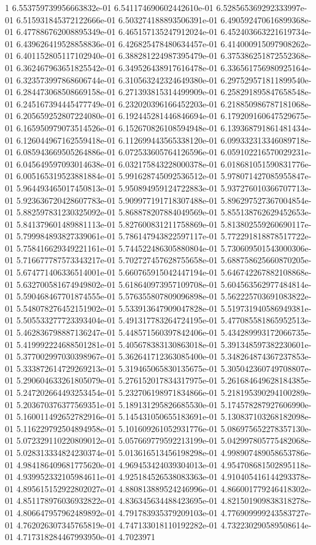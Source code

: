 1	6.553759739956663832e-01	6.541174690602442610e-01	6.528565369292333997e-01	6.515931845372122666e-01	6.503274188893506391e-01	6.490592470616899368e-01	6.477886762008895349e-01	6.465157135247912024e-01	6.452403663221619734e-01	6.439626419528858836e-01	6.426825478480634457e-01	6.414000915097908262e-01	6.401152805117102940e-01	6.388281224987395479e-01	6.375386251872552368e-01	6.362467963651825542e-01	6.349526438917616478e-01	6.336561756980925164e-01	6.323573997868606744e-01	6.310563242324649380e-01	6.297529571811899540e-01	6.284473068508669158e-01	6.271393815314499909e-01	6.258291895847658548e-01	6.245167394445477749e-01	6.232020396166452203e-01	6.218850986787181068e-01	6.205659252807224080e-01	6.192445281446846694e-01	6.179209160647529675e-01	6.165950979073514526e-01	6.152670826108594948e-01	6.139368791861481434e-01	6.126044967162559418e-01	6.112699443565338120e-01	6.099332313346089718e-01	6.085943669505264886e-01	6.072533605764126596e-01	6.059102216570029231e-01	6.045649597093014638e-01	6.032175843228000378e-01	6.018681051590831776e-01	6.005165319523881884e-01	5.991628745092536512e-01	5.978071427085955847e-01	5.964493465017450813e-01	5.950894959124722883e-01	5.937276010366707713e-01	5.923636720428607783e-01	5.909977191718307488e-01	5.896297527367004854e-01	5.882597831230325092e-01	5.868878207884049569e-01	5.855138762629452653e-01	5.841379601489881113e-01	5.827600831211758869e-01	5.813802559260690117e-01	5.799984893827339061e-01	5.786147943822597117e-01	5.772291818878517722e-01	5.758416629349221161e-01	5.744522486305880804e-01	5.730609501543000306e-01	5.716677787573343217e-01	5.702727457628755658e-01	5.688758625660870205e-01	5.674771406336514001e-01	5.660765915042447194e-01	5.646742267882108868e-01	5.632700581674949802e-01	5.618640973957109708e-01	5.604563562977484814e-01	5.590468467701874555e-01	5.576355807809096898e-01	5.562225703691083822e-01	5.548078276452151902e-01	5.533913647909047828e-01	5.519731940586949381e-01	5.505533277723393404e-01	5.491317783264724195e-01	5.477085581865952513e-01	5.462836798887136247e-01	5.448571560397842406e-01	5.434289993172066735e-01	5.419992224688501281e-01	5.405678383130863018e-01	5.391348597382230601e-01	5.377002997030398967e-01	5.362641712363085400e-01	5.348264874367237853e-01	5.333872614729269213e-01	5.319465065830135675e-01	5.305042360749708807e-01	5.290604633261805079e-01	5.276152017834317975e-01	5.261684649628184385e-01	5.247202664493253454e-01	5.232706198971834866e-01	5.218195390294100289e-01	5.203670376377569351e-01	5.189131295826685530e-01	5.174578287927606990e-01	5.160011492652782916e-01	5.145431050655183691e-01	5.130837103268182098e-01	5.116229792504894958e-01	5.101609261052931776e-01	5.086975652278357130e-01	5.072329110220809012e-01	5.057669779592213199e-01	5.042997805775482068e-01	5.028313334824230374e-01	5.013616513456198298e-01	4.998907489058653786e-01	4.984186409681775620e-01	4.969453424039304013e-01	4.954708681502895118e-01	4.939952332105984611e-01	4.925184526538083363e-01	4.910405416144293378e-01	4.895615152922802027e-01	4.880813889524246996e-01	4.866001779246418302e-01	4.851178976036932822e-01	4.836345634488423695e-01	4.821501909838318278e-01	4.806647957962489892e-01	4.791783935379209103e-01	4.776909999243583727e-01	4.762026307345765819e-01	4.747133018110192282e-01	4.732230290589508614e-01	4.717318284467993950e-01	4.7023971